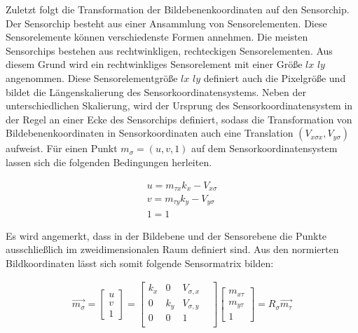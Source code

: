 Zuletzt folgt die Transformation der Bildebenenkoordinaten auf den Sensorchip. Der Sensorchip besteht aus einer Ansammlung von Sensorelementen. Diese Sensorelemente können verschiedenste Formen annehmen. Die meisten Sensorchips bestehen aus rechtwinkligen, rechteckigen Sensorelementen. Aus diesem Grund wird ein rechtwinkliges Sensorelement mit einer Größe $lx$ $ly$ angenommen. Diese Sensorelementgröße $lx$ $ly$ definiert auch die Pixelgröße und bildet die Längenskalierung des Sensorkoordinatensystems. Neben der unterschiedlichen Skalierung, wird der Ursprung des Sensorkoordinatensystem in der Regel an einer Ecke des Sensorchips definiert, sodass die Transformation von Bildebenenkoordinaten in Sensorkoordinaten auch eine Translation $(V_{x\sigma x},V_{y\sigma})$ aufweist. Für einen Punkt $m_\sigma = ({u},{v},1)$ auf dem Sensorkoordinatensystem lassen sich die folgenden Bedingungen herleiten. %

\begin{gather}	
{u}=m_{\tau x} k_x - V_{x\sigma}\\
{v}=m_{\tau y} k_y - V_{y\sigma}\\
1=1
\end{gather}

Es wird angemerkt, dass in der Bildebene und der Sensorebene die Punkte ausschließlich im zweidimensionalen Raum definiert sind. Aus den normierten Bildkoordinaten lässt sich somit folgende Sensormatrix bilden:

\begin{gather}
\vec{m_\sigma}=\begin{bmatrix}u \\v\\1 \end{bmatrix}=
\begin{bmatrix}
k_x&0&V_{\sigma,x}\\
0&k_y&V_{\sigma,y}\\
0&0&1&\\
\end{bmatrix}
\begin{bmatrix}m_{x \tau}\\ m_{y \tau}\\ 1\end{bmatrix}= R_\sigma \vec{m_\tau}
\end{gather}

